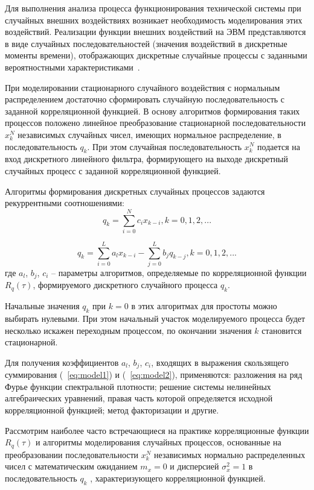 Для выполнения анализа процесса функционирования технической
системы при случайных внешних воздействиях возникает необходимость
моделирования этих воздействий. Реализации функции внешних воздействий на
ЭВМ представляются в виде случайных последовательностей (значения
воздействий в дискретные моменты времени), отображающих дискретные
случайные процессы с заданными вероятностными характеристиками~\cite{modeling:2004}.

При моделировании стационарного случайного воздействия с нормальным
распределением достаточно сформировать случайную последовательность с
заданной корреляционной функцией. В основу алгоритмов формирования таких
процессов положено линейное преобразование стационарной
последовательности ${x}_{k}^{N}$ независимых случайных чисел, имеющих нормальное
распределение, в последовательность ${q}_{k}$. При этом случайная
последовательность ${x}_{k}^{N}$ подается на вход дискретного линейного фильтра,
формирующего на выходе дискретный случайных процесс с заданной
корреляционной функцией.

Алгоритмы формирования дискретных случайных процессов задаются
рекуррентными соотношениями:
\begin{equation} \label{eq:model1}
{q}_{k} = \sum_{i=0}^{N} c_i x_{k-i}, k=0,1,2,...
\end{equation}

\begin{equation} \label{eq:model2}
{q}_{k} = \sum_{i=0}^{L} a_l x_{k-i} - \sum_{j=0}^{L} b_j q_{k-j}, k=0,1,2,...
\end{equation}
где $a_l$, $b_j$, $c_i$ – параметры алгоритмов, определяемые по корреляционной функции ${R}_{q}(\tau)$, формируемого дискретного случайного процесса $q_k$.

Начальные значения $q_k$ при $k = 0$ в этих алгоритмах для простоты можно
выбирать нулевыми. При этом начальный участок моделируемого процесса
будет несколько искажен переходным процессом, по окончании значения $k$
становится стационарной.

Для получения коэффициентов $a_l$, $b_j$, $c_i$, входящих в выражения
скользящего суммирования (~\ref{eq:model1}) и (~\ref{eq:model2}), применяются: разложения на ряд Фурье
функции спектральной плотности; решение системы нелинейных
алгебраических уравнений, правая часть которой определяется исходной
корреляционной функцией; метод факторизации и другие.

Рассмотрим наиболее часто встречающиеся на практике корреляционные
функции ${R}_{q}(\tau)$ и алгоритмы моделирования случайных процессов, основанные на
преобразовании последовательности ${x}_{k}^{N}$ независимых нормально
распределенных чисел с математическим ожиданием $m_x = 0$ и дисперсией
${\sigma}_{x}^{2} = 1$ в
последовательность $q_k$ , характеризующего корреляционной функцией.


